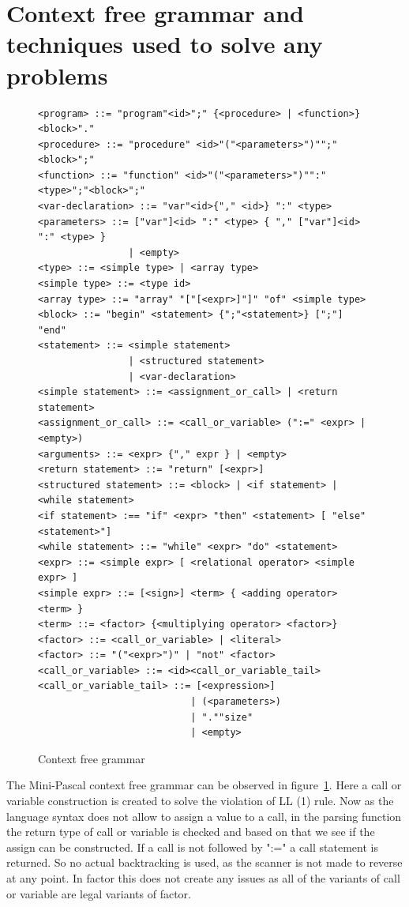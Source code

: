 \documentclass[12pt,a4paper]{article}
\begin{document}
\section{Context free grammar and techniques used to solve any problems}
\begin{figure}
\caption{Context free grammar}\label{cfg}
\begin{verbatim}
<program> ::= "program"<id>";" {<procedure> | <function>}<block>"."
<procedure> ::= "procedure" <id>"("<parameters>")"";"<block>";"
<function> ::= "function" <id>"("<parameters>")"":"<type>";"<block>";"
<var-declaration> ::= "var"<id>{"," <id>} ":" <type>
<parameters> ::= ["var"]<id> ":" <type> { "," ["var"]<id> ":" <type> }
                | <empty>
<type> ::= <simple type> | <array type>
<simple type> ::= <type id>
<array type> ::= "array" "["[<expr>]"]" "of" <simple type>
<block> ::= "begin" <statement> {";"<statement>} [";"] "end"
<statement> ::= <simple statement>
                | <structured statement>
                | <var-declaration>
<simple statement> ::= <assignment_or_call> | <return statement>
<assignment_or_call> ::= <call_or_variable> (":=" <expr> | <empty>)
<arguments> ::= <expr> {"," expr } | <empty>
<return statement> ::= "return" [<expr>]
<structured statement> ::= <block> | <if statement> | <while statement>
<if statement> :== "if" <expr> "then" <statement> [ "else" <statement>"]
<while statement> ::= "while" <expr> "do" <statement>
<expr> ::= <simple expr> [ <relational operator> <simple expr> ]
<simple expr> ::= [<sign>] <term> { <adding operator> <term> }
<term> ::= <factor> {<multiplying operator> <factor>}
<factor> ::= <call_or_variable> | <literal> 
<factor> ::= "("<expr>")" | "not" <factor>
<call_or_variable> ::= <id><call_or_variable_tail>
<call_or_variable_tail> ::= [<expression>]
                           | (<parameters>)
                           | ".""size"
                           | <empty> 
\end{verbatim}
\end{figure}

The Mini-Pascal context free grammar can be observed in figure~\ref{cfg}.  Here
a call or variable construction is created to solve the violation of LL (1)
rule. Now as the language syntax does not allow to assign a value to a call, in
the parsing function the return type of call or variable is checked and based
on that we see if the assign can be constructed. If a call is not followed by
":=" a call statement is returned. So no actual backtracking is used, as the
scanner is not made to reverse at any point.  In factor this does not create
any issues as all of the variants of call or variable are legal variants of
factor.
\end{document}
